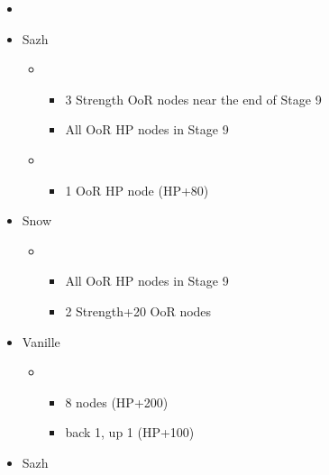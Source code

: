 \begin{menu}
	\begin{itemize}
	\paradigm
		\begin{itemize}
			\item {}%
				{\paradigmline{\com}{\com}{\com}}%
				{\paradigmline[4]{\com}{(\sen)}{(\med)}}%
				{\paradigmline{(\com)}{\sen}{(\rav)}}%
				{\paradigmline{\rav}{(\sen)}{\rav}}%
				{\paradigmline{(\syn)}{\sen}{(\med)}}%
				{\paradigmline{(\sen)}{\sen}{(\sen)}}%
		\end{itemize}
	\crystarium
		\begin{itemize}
			\item Sazh
				\begin{itemize}
					\item \com
						\begin{itemize}
							\item 3 Strength OoR nodes near the end of Stage 9
							\item All OoR HP nodes in Stage 9
						\end{itemize}
					\item \rav
						\begin{itemize}
							\item 1 OoR HP node (HP+80)
						\end{itemize}
				\end{itemize}
			\item Snow
				\begin{itemize}
					\item \com
						\begin{itemize}
							\item All OoR HP nodes in Stage 9
							\item 2 Strength+20 OoR nodes
						\end{itemize}
				\end{itemize}
			\item Vanille
				\begin{itemize}
					\item \rav
						\begin{itemize}
							\item 8 nodes (HP+200)
							\item back 1, up 1 (HP+100)
						\end{itemize}
				\end{itemize}								
		\end{itemize}
	\equip
		\begin{itemize}
			\item Sazh

\end{itemize}
\end{itemize}
\end{menu}
